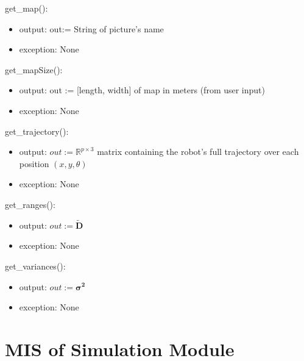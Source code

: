 \documentclass[12pt, titlepage]{article}
\begin{document}
\noindent get\_map():
\begin{itemize}
    \item output: out:=  String of picture's name  
    \item exception: None
\end{itemize}

\noindent get\_mapSize():
\begin{itemize}
  \item output: out := [length, width] of map in meters (from user input)
  \item exception: None
\end{itemize}

\noindent get\_trajectory():
\begin{itemize}
  \item output: $out := \mathbb{R}^{p\times 3}$ matrix containing the robot's full trajectory over each position $(x, y, \theta)$
  \item exception: None
\end{itemize}

\noindent get\_ranges():
\begin{itemize}
    \item output: $out:=\mathbf{\tilde{D}}$
    \item exception: None
\end{itemize}

\noindent get\_variances():
\begin{itemize}
    \item output: $out:=\boldsymbol{\sigma^2}$
    \item exception: None
\end{itemize}


\newpage

\section{MIS of Simulation Module} \label{M_Simulate} 


\end{document}
